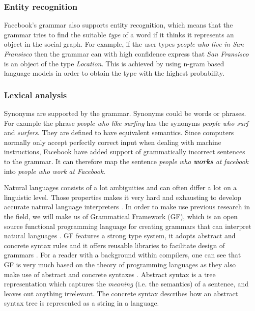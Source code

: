 \subsubsection*{Entity recognition}
Facebook's grammar also supports entity recognition, which means that the grammar tries to find the suitable \emph{type} of a word if it thinks it represents an object in the social graph. For example, if the user types \emph{people who live in San Fransisco} then the grammar can with high confidence express that \emph{San Fransisco} is an object of the type \emph{Location}. This is achieved by using n-gram based language models in order to obtain the type with the highest probability.

\subsubsection*{Lexical analysis}
Synonyms are supported by the grammar. Synonyms could be words or phrases. For example the phrase \emph{people who like surfing} has the synonyms \emph{people who surf} and \emph{surfers}. They are defined to have equivalent semantics.
\newline
\newline
Since computers normally only accept perfectly correct input when dealing with machine instructions, Facebook have added support of grammatically incorrect sentences to the grammar. It can therefore map the sentence \emph{people who \textbf{works} at facebook} into \emph{people who work at Facebook}.

\label{sec:gf}
Natural languages consists of a lot ambiguities and can often differ a lot on a linguistic level. Those properties makes it very hard and exhausting to develop accurate natural language interpreters \cite{kaufmann:2007}. In order to make use previous research in the field, we will make us of Grammatical Framework (GF), which is an open source functional programming language for creating grammars that can interpret natural languages \cite[p. 1]{ranta:2011}. GF features a strong type system, it adopts abstract and concrete syntax rules and it offers reusable libraries to facilitate design of grammars \cite{gf-rgl}. For a reader with a background within compilers, one can see that GF is very much based on the theory of programming languages as they also make use of abstract and concrete syntaxes \cite[pp. 69-70]{Aho:1986:CPT:6448}.
\newline
\newline
Abstract syntax is a tree representation which captures the \emph{meaning} (i.e. the semantics) of a sentence, and leaves out anything irrelevant. The concrete syntax describes how an abstract syntax tree is represented as a string in a language.

